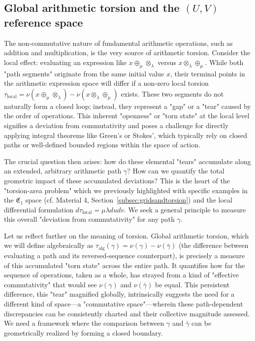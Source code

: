 \subsection{Global arithmetic torsion and the $(U,V)$ reference space}
\label{sec:global_torsion_uv_narrative_enhanced}

The non-commutative nature of fundamental arithmetic operations, such as addition and multiplication, is the very source of arithmetic torsion. Consider the local effect: evaluating an expression like $x \oplus_\mu \otimes_\lambda$ versus $x \otimes_\lambda \oplus_\mu$. While both "path segments" originate from the same initial value $x$, their terminal points in the arithmetic expression space will differ if a non-zero local torsion $\tau_{\text{local}} = \nu(x \oplus_\mu \otimes_\lambda) - \nu(x \otimes_\lambda \oplus_\mu)$ exists. These two segments do not naturally form a closed loop; instead, they represent a "gap" or a "tear" caused by the order of operations. This inherent "openness" or "torn state" at the local level signifies a deviation from commutativity and poses a challenge for directly applying integral theorems like Green's or Stokes', which typically rely on closed paths or well-defined bounded regions within the space of action.

The crucial question then arises: how do these elemental "tears" accumulate along an extended, arbitrary arithmetic path $\gamma$? How can we quantify the total geometric impact of these accumulated deviations? This is the heart of the "torsion-area problem" which we previously highlighted with specific examples in the $\mathfrak{E}_1$ space (cf. Material 4, Section~\ref{subsec:gridsandtorsion}) and the local differential formulation $d\tau_{\text{local}} = \mu \lambda du dv$. We seek a general principle to measure this overall "deviation from commutativity" for any path $\gamma$.

Let us reflect further on the meaning of torsion. Global arithmetic torsion, which we will define algebraically as $\tau_{\text{alg}}(\gamma) = \nu(\gamma) - \nu(\bar{\gamma})$ (the difference between evaluating a path and its reversed-sequence counterpart), is precisely a measure of this accumulated "torn state" across the entire path. It quantifies how far the sequence of operations, taken as a whole, has strayed from a kind of "effective commutativity" that would see $\nu(\gamma)$ and $\nu(\bar{\gamma})$ be equal. This persistent difference, this "tear" magnified globally, intrinsically suggests the need for a different kind of space—a "commutative space"—wherein these path-dependent discrepancies can be consistently charted and their collective magnitude assessed. We need a framework where the comparison between $\gamma$ and $\bar{\gamma}$ can be geometrically realized by forming a closed boundary.

